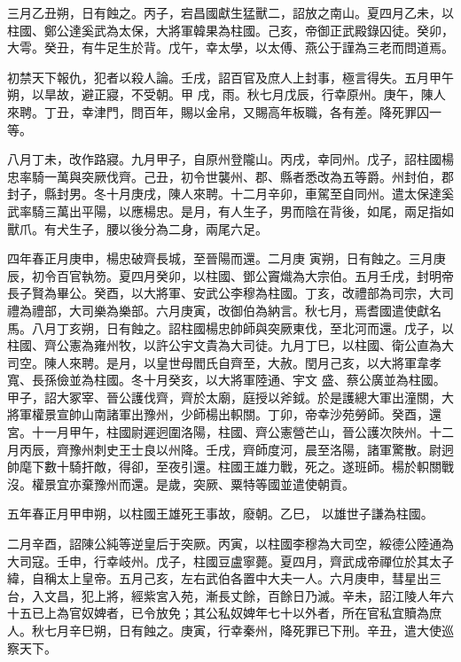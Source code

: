 \begin{pinyinscope}
 三月乙丑朔，日有蝕之。丙子，宕昌國獻生猛獸二，詔放之南山。夏四月乙未，以柱國、鄭公達奚武為太保，大將軍韓果為柱國。己亥，帝御正武殿錄囚徒。癸卯，大雩。癸丑，有牛足生於背。戊午，幸太學，以太傅、燕公于謹為三老而問道焉。



 初禁天下報仇，犯者以殺人論。壬戌，詔百官及庶人上封事，極言得失。五月甲午朔，以旱故，避正寢，不受朝。甲
 戌，雨。秋七月戊辰，行幸原州。庚午，陳人來聘。丁丑，幸津門，問百年，賜以金帛，又賜高年板職，各有差。降死罪囚一等。



 八月丁未，改作路寢。九月甲子，自原州登隴山。丙戌，幸同州。戊子，詔柱國楊忠率騎一萬與突厥伐齊。己丑，初令世襲州、郡、縣者悉改為五等爵。州封伯，郡封子，縣封男。冬十月庚戌，陳人來聘。十二月辛卯，車駕至自同州。遣太保達奚武率騎三萬出平陽，以應楊忠。是月，有人生子，男而陰在背後，如尾，兩足指如獸爪。有犬生子，腰以後分為二身，兩尾六足。



 四年春正月庚申，楊忠破齊長城，至晉陽而還。二月庚
 寅朔，日有蝕之。三月庚辰，初令百官執笏。夏四月癸卯，以柱國、鄧公竇熾為大宗伯。五月壬戌，封明帝長子賢為畢公。癸酉，以大將軍、安武公李穆為柱國。丁亥，改禮部為司宗，大司禮為禮部，大司樂為樂部。六月庚寅，改御伯為納言。秋七月，焉耆國遣使獻名馬。八月丁亥朔，日有蝕之。詔柱國楊忠帥師與突厥東伐，至北河而還。戊子，以柱國、齊公憲為雍州牧，以許公宇文貴為大司徒。九月丁巳，以柱國、衛公直為大司空。陳人來聘。是月，以皇世母閻氏自齊至，大赦。閏月己亥，以大將軍韋孝寬、長孫儉並為柱國。冬十月癸亥，以大將軍陸通、宇文
 盛、蔡公廣並為柱國。甲子，詔大冢宰、晉公護伐齊，齊於太廟，庭授以斧鉞。於是護總大軍出潼關，大將軍權景宣帥山南諸軍出豫州，少師楊出軹關。丁卯，帝幸沙苑勞師。癸酉，還宮。十一月甲午，柱國尉遲迥圍洛陽，柱國、齊公憲營芒山，晉公護次陜州。十二月丙辰，齊豫州刺史王士良以州降。壬戌，齊師度河，晨至洛陽，諸軍驚散。尉迥帥麾下數十騎扞敵，得卻，至夜引還。柱國王雄力戰，死之。遂班師。楊於軹關戰沒。權景宜亦棄豫州而還。是歲，突厥、粟特等國並遣使朝貢。



 五年春正月甲申朔，以柱國王雄死王事故，廢朝。乙巳，
 以雄世子謙為柱國。



 二月辛酉，詔陳公純等逆皇后于突厥。丙寅，以柱國李穆為大司空，綏德公陸通為大司寇。壬申，行幸岐州。戊子，柱國豆盧寧薨。夏四月，齊武成帝禪位於其太子緯，自稱太上皇帝。五月己亥，左右武伯各置中大夫一人。六月庚申，彗星出三台，入文昌，犯上將，經紫宮入苑，漸長丈餘，百餘日乃滅。辛未，詔江陵人年六十五已上為官奴婢者，已令放免；其公私奴婢年七十以外者，所在官私宜贖為庶人。秋七月辛巳朔，日有蝕之。庚寅，行幸秦州，降死罪已下刑。辛丑，遣大使巡察天下。




\end{pinyinscope}
